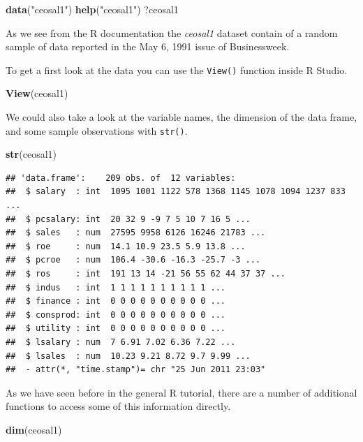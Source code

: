 \documentclass[]{book}
\newenvironment{Shaded}{\begin{snugshade}}{\end{snugshade}}
\newcommand{\KeywordTok}[1]{\textcolor[rgb]{0.13,0.29,0.53}{\textbf{#1}}}
\newcommand{\NormalTok}[1]{#1}
\newcommand{\StringTok}[1]{\textcolor[rgb]{0.31,0.60,0.02}{#1}}
\begin{document}
\begin{Shaded}
\begin{Highlighting}[]
\KeywordTok{data}\NormalTok{(}\StringTok{"ceosal1"}\NormalTok{)}
\KeywordTok{help}\NormalTok{(}\StringTok{"ceosal1"}\NormalTok{)}
\NormalTok{?ceosal1}
\end{Highlighting}
\end{Shaded}

As we see from the R documentation the \emph{ceosal1} dataset contain of
a random sample of data reported in the May 6, 1991 issue of
Businessweek.

To get a first look at the data you can use the \texttt{View()} function
inside R Studio.

\begin{Shaded}
\begin{Highlighting}[]
\KeywordTok{View}\NormalTok{(ceosal1)}
\end{Highlighting}
\end{Shaded}

We could also take a look at the variable names, the dimension of the
data frame, and some sample observations with \texttt{str()}.

\begin{Shaded}
\begin{Highlighting}[]
\KeywordTok{str}\NormalTok{(ceosal1)}
\end{Highlighting}
\end{Shaded}

\begin{verbatim}
## 'data.frame':    209 obs. of  12 variables:
##  $ salary  : int  1095 1001 1122 578 1368 1145 1078 1094 1237 833 ...
##  $ pcsalary: int  20 32 9 -9 7 5 10 7 16 5 ...
##  $ sales   : num  27595 9958 6126 16246 21783 ...
##  $ roe     : num  14.1 10.9 23.5 5.9 13.8 ...
##  $ pcroe   : num  106.4 -30.6 -16.3 -25.7 -3 ...
##  $ ros     : int  191 13 14 -21 56 55 62 44 37 37 ...
##  $ indus   : int  1 1 1 1 1 1 1 1 1 1 ...
##  $ finance : int  0 0 0 0 0 0 0 0 0 0 ...
##  $ consprod: int  0 0 0 0 0 0 0 0 0 0 ...
##  $ utility : int  0 0 0 0 0 0 0 0 0 0 ...
##  $ lsalary : num  7 6.91 7.02 6.36 7.22 ...
##  $ lsales  : num  10.23 9.21 8.72 9.7 9.99 ...
##  - attr(*, "time.stamp")= chr "25 Jun 2011 23:03"
\end{verbatim}

As we have seen before in the general R tutorial, there are a number of
additional functions to access some of this information directly.

\begin{Shaded}
\begin{Highlighting}[]
\KeywordTok{dim}\NormalTok{(ceosal1)}
\end{Highlighting}
\end{Shaded}
\end{document}
